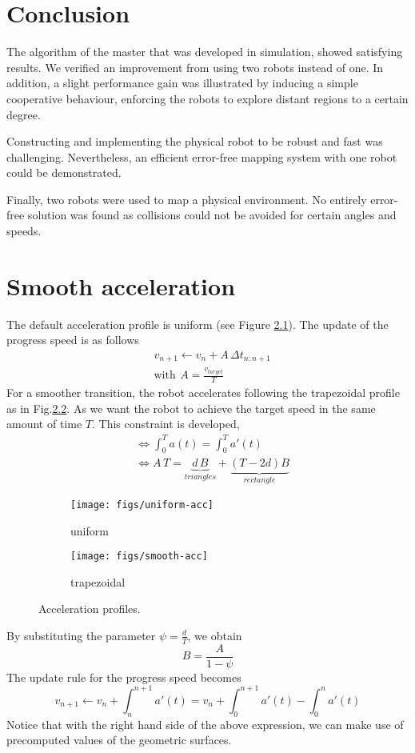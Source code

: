 \documentclass[12pt]{report}
\begin{document}
\chapter{Conclusion}\label{conclusion}
The algorithm of the master that was developed in simulation, showed satisfying results. We verified an improvement from using two robots instead of one. In addition, a slight performance gain was illustrated by inducing a simple cooperative behaviour, enforcing the robots to explore distant regions to a certain degree.

Constructing and implementing the physical robot to be robust and fast was challenging. Nevertheless, an efficient error-free mapping system with one robot could be demonstrated.

Finally, two robots were used to map a physical environment. No entirely error-free solution was found as collisions could not be avoided for certain angles and speeds.




\newpage
\appendix
\chapter{Smooth acceleration}\label{chap-extra}
The default acceleration profile is uniform (see Figure \ref{fig:a}). The update of the progress speed is as follows
\begin{align*}
&v_{n+1} \leftarrow v_n + A \, \Delta t_{n:n+1}\\
&\text{with}\,\ A = \frac{v_{target}}{T}
\end{align*}
For a smoother transition, the robot accelerates following the trapezoidal profile as in Fig.\ref{fig:b}. As we want the robot to achieve the target speed in the same amount of time $T$. This constraint is developed,
\begin{align*}
&\Leftrightarrow \int_{0}^{T}a(t) =  \int_{0}^{T}a'(t) \\
&\Leftrightarrow A\,T = \underbrace{d\,B}_{triangles} + \underbrace{(T - 2d)B}_{rectangle}
\end{align*}
\begin{figure}[!h]
\centering
\begin{subfigure}{.5\textwidth}
  \centering
  \texttt{[image: figs/uniform-acc]}
  \caption{uniform}
  \label{fig:a}
\end{subfigure}%
\begin{subfigure}{.5\textwidth}
  \centering
  \texttt{[image: figs/smooth-acc]}
  \caption{trapezoidal}
  \label{fig:b}
\end{subfigure}
\caption{Acceleration profiles.}
\label{fig:ab}
\end{figure}
By substituting the parameter $\psi = \frac{d}{T}$, we obtain
$$
\boxed{B = \frac{A}{1-\psi}} 
$$
The update rule for the progress speed becomes
$$
v_{n+1} \leftarrow v_n + \int_{n}^{n+1}a'(t) = v_n + \int_{0}^{n+1}a'(t) - \int_{0}^{n}a'(t)
$$
Notice that with the right hand side of the above expression, we can make use of precomputed values of the geometric surfaces.
\end{document}
